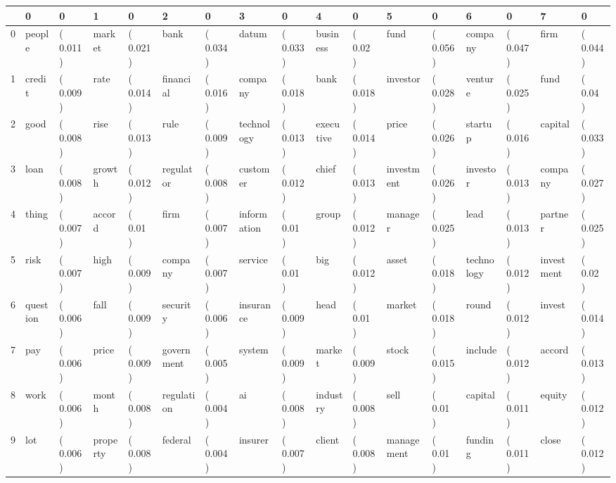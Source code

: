 \begin{tabular}{lllllllllllllllll}
\toprule
{} &         0 &          0 &         1 &          0 &           2 &          0 &            3 &          0 &          4 &          0 &           5 &          0 &           6 &          0 &           7 &          0 \\
\midrule
0 &    people &  ( 0.011 ) &    market &  ( 0.021 ) &        bank &  ( 0.034 ) &        datum &  ( 0.033 ) &   business &   ( 0.02 ) &        fund &  ( 0.056 ) &     company &  ( 0.047 ) &        firm &  ( 0.044 ) \\
1 &    credit &  ( 0.009 ) &      rate &  ( 0.014 ) &   financial &  ( 0.016 ) &      company &  ( 0.018 ) &       bank &  ( 0.018 ) &    investor &  ( 0.028 ) &     venture &  ( 0.025 ) &        fund &   ( 0.04 ) \\
2 &      good &  ( 0.008 ) &      rise &  ( 0.013 ) &        rule &  ( 0.009 ) &   technology &  ( 0.013 ) &  executive &  ( 0.014 ) &       price &  ( 0.026 ) &     startup &  ( 0.016 ) &     capital &  ( 0.033 ) \\
3 &      loan &  ( 0.008 ) &    growth &  ( 0.012 ) &   regulator &  ( 0.008 ) &     customer &  ( 0.012 ) &      chief &  ( 0.013 ) &  investment &  ( 0.026 ) &    investor &  ( 0.013 ) &     company &  ( 0.027 ) \\
4 &     thing &  ( 0.007 ) &    accord &   ( 0.01 ) &        firm &  ( 0.007 ) &  information &   ( 0.01 ) &      group &  ( 0.012 ) &     manager &  ( 0.025 ) &        lead &  ( 0.013 ) &     partner &  ( 0.025 ) \\
5 &      risk &  ( 0.007 ) &      high &  ( 0.009 ) &     company &  ( 0.007 ) &      service &   ( 0.01 ) &        big &  ( 0.012 ) &       asset &  ( 0.018 ) &  technology &  ( 0.012 ) &  investment &   ( 0.02 ) \\
6 &  question &  ( 0.006 ) &      fall &  ( 0.009 ) &    security &  ( 0.006 ) &    insurance &  ( 0.009 ) &       head &   ( 0.01 ) &      market &  ( 0.018 ) &       round &  ( 0.012 ) &      invest &  ( 0.014 ) \\
7 &       pay &  ( 0.006 ) &     price &  ( 0.009 ) &  government &  ( 0.005 ) &       system &  ( 0.009 ) &     market &  ( 0.009 ) &       stock &  ( 0.015 ) &     include &  ( 0.012 ) &      accord &  ( 0.013 ) \\
8 &      work &  ( 0.006 ) &     month &  ( 0.008 ) &  regulation &  ( 0.004 ) &           ai &  ( 0.008 ) &   industry &  ( 0.008 ) &        sell &   ( 0.01 ) &     capital &  ( 0.011 ) &      equity &  ( 0.012 ) \\
9 &       lot &  ( 0.006 ) &  property &  ( 0.008 ) &     federal &  ( 0.004 ) &      insurer &  ( 0.007 ) &     client &  ( 0.008 ) &  management &   ( 0.01 ) &     funding &  ( 0.011 ) &       close &  ( 0.012 ) \\
\bottomrule
\end{tabular}
